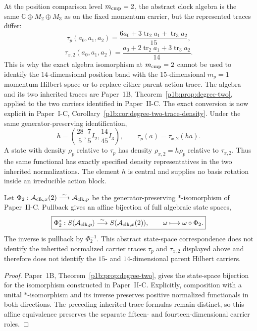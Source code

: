 \documentclass[12pt,a4paper]{article}
\begin{document}
\begin{remark}
\label{p4:rem:chiral-algebra-inherited-trace-comparison}
At the position comparison level $m_{\rm cmp}=2$, the abstract clock algebra
is the same $\mathbb C\oplus M_2\oplus M_3$ as on the fixed momentum
carrier, but the represented traces differ:
\[
 \tau_p(a_0,a_1,a_2)=
 \frac{6a_0+3\operatorname{tr}_2a_1+\operatorname{tr}_3a_2}{15},
\]
\[
 \tau_{x,2}(a_0,a_1,a_2)=
 \frac{a_0+2\operatorname{tr}_2a_1+3\operatorname{tr}_3a_2}{14}.
\]
This is why the exact algebra isomorphism at $m_{\rm cmp}=2$ cannot be used
to identify the $14$-dimensional position band with the $15$-dimensional
$m_p=1$ momentum Hilbert space or to replace either parent action trace.
The algebra and its two inherited traces are Paper~1B,
Theorem~\ref{p1b:prop:degree-two}, applied to the two carriers
identified in Paper~II-C.
The exact conversion is now explicit in Paper~I-C,
Corollary~\ref{p1b:cor:degree-two-trace-density}. Under the same
generator-preserving identification,
\[
 h=\left(\frac{28}{5},\frac75I_2,\frac{14}{45}I_3\right),
 \qquad \tau_p(a)=\tau_{x,2}(ha).
\]
A state with density \(\rho_p\) relative to \(\tau_p\) has
density \(\rho_{x,2}=h\rho_p\) relative to \(\tau_{x,2}\).
Thus the same functional has exactly specified density representatives
in the two inherited normalizations. The element \(h\) is central
and supplies no basis rotation inside an irreducible action block.
\end{remark}


\begin{corollary}
\label{p4:cor:v185-clock-state-space-equivalence}
Let
\(
 \Phi_2:\mathcal A_{{\rm clk},x}(2)\overset\sim\longrightarrow
 \mathcal A_{{\rm clk},p}
\)
be the generator-preserving $*$-isomorphism of Paper~II-C.  Pullback gives an
affine bijection of full algebraic state spaces,
\[
 \boxed{
 \Phi_2^*:S(\mathcal A_{{\rm clk},p})
 \overset\sim\longrightarrow S(\mathcal A_{{\rm clk},x}(2)),
 \qquad \omega\longmapsto\omega\circ\Phi_2.}
\]
The inverse is pullback by $\Phi_2^{-1}$.  This abstract state-space
correspondence does not identify the inherited normalized carrier traces
$\tau_p$ and $\tau_{x,2}$ displayed above and therefore does not identify the
$15$- and $14$-dimensional parent Hilbert carriers.
\end{corollary}
\begin{proof}
Paper~1B, Theorem~\ref{p1b:prop:degree-two}, gives the state-space
bijection for the isomorphism constructed in Paper~II-C. Explicitly,
composition with a unital $*$-isomorphism and its inverse preserves
positive normalized functionals in both directions. The preceding
inherited trace formulas remain distinct, so this affine equivalence
preserves the separate fifteen- and fourteen-dimensional carrier roles.
\end{proof}
\end{document}
